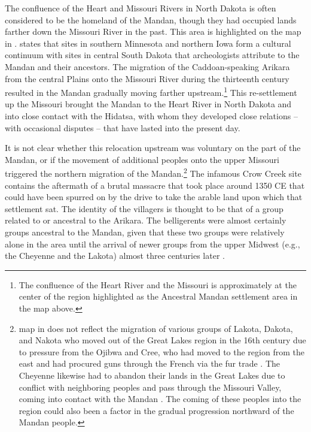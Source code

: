 The confluence of the Heart and Missouri Rivers in North Dakota is often considered to be the homeland of the Mandan, though they had occupied lands farther down the Missouri River in the past. This area is highlighted on the map in . \citet[26]{lehmer1971} states that sites in southern Minnesota and northern Iowa form a cultural continuum with sites in central South Dakota that archeologists attribute to the Mandan and their ancestors. The migration of the Caddoan-speaking Arikara from the central Plains onto the Missouri River during the thirteenth century resulted in the Mandan gradually moving farther upstream.\footnote{The confluence of the Heart River and the Missouri is approximately at the center of the region highlighted as the Ancestral Mandan settlement area in the map above.} This re-settlement up the Missouri brought the Mandan to the Heart River in North Dakota and into close contact with the Hidatsa, with whom they developed close relations -- with occasional disputes -- that have lasted into the present day.

It is not clear whether this relocation upstream was voluntary on the part of the Mandan, or if the movement of additional peoples onto the upper Missouri triggered the northern migration of the Mandan.\footnote{ map in  does not reflect the migration of various groups of Lakota, Dakota, and Nakota who moved out of the Great Lakes region in the 16th century due to pressure from the Ojibwa and Cree, who had moved to the region from the east and had procured guns through the French via the fur trade \citep[170]{riggs1893}. The Cheyenne likewise had to abandon their lands in the Great Lakes due to conflict with neighboring peoples and pass through the Missouri Valley, coming into contact with the Mandan \citep[18]{moore1999}. The coming of these peoples into the region could also been a factor in the gradual progression northward of the Mandan people.} The infamous Crow Creek site contains the aftermath of a brutal massacre that took place around 1350 CE that could have been spurred on by the drive to take the arable land upon which that settlement sat. The identity of the villagers is thought to be that of a group related to or ancestral to the Arikara. The belligerents were almost certainly groups ancestral to the Mandan, given that these two groups were relatively alone in the area until the arrival of newer groups from the upper Midwest (e.g., the Cheyenne and the Lakota) almost three centuries later \citep{zimmerman1980,fenn2015}.

